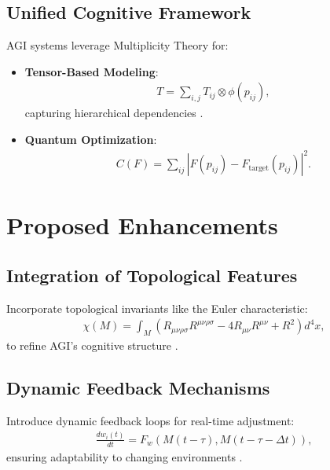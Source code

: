 \documentclass{article}
\theoremstyle{plain}
\begin{document}
\subsection{Unified Cognitive Framework}
AGI systems leverage Multiplicity Theory for:
\begin{itemize}
    \item \textbf{Tensor-Based Modeling}:
    \begin{equation}
    \begin{aligned}
    T = \sum_{i,j} T_{ij} \otimes \phi(p_{ij}),
    \end{aligned}
    \end{equation}
    capturing hierarchical dependencies \cite{LeCun2015}.
    \item \textbf{Quantum Optimization}:
    \begin{equation}
    \begin{aligned}
    C(F) = \sum_{ij} \left|F(p_{ij}) - F_{\text{target}}(p_{ij})\right|^2.
    \end{aligned}
    \end{equation}
\end{itemize}

\section{Proposed Enhancements}
\subsection{Integration of Topological Features}
Incorporate topological invariants like the Euler characteristic:
\begin{equation}
\begin{aligned}
\chi(M) = \int_{M} \left( R_{\mu\nu\rho\sigma} R^{\mu\nu\rho\sigma} - 4 R_{\mu\nu} R^{\mu\nu} + R^2 \right) d^4x,
\end{aligned}
\end{equation}
to refine AGI’s cognitive structure \cite{Chalmers1995}.

\subsection{Dynamic Feedback Mechanisms}
Introduce dynamic feedback loops for real-time adjustment:
\begin{equation}
\begin{aligned}
\frac{dw_{i}(t)}{dt} = F_w(M(t-\tau), M(t-\tau-\Delta t)),
\end{aligned}
\end{equation}
ensuring adaptability to changing environments \cite{Lloyd2000}.
\end{document}
